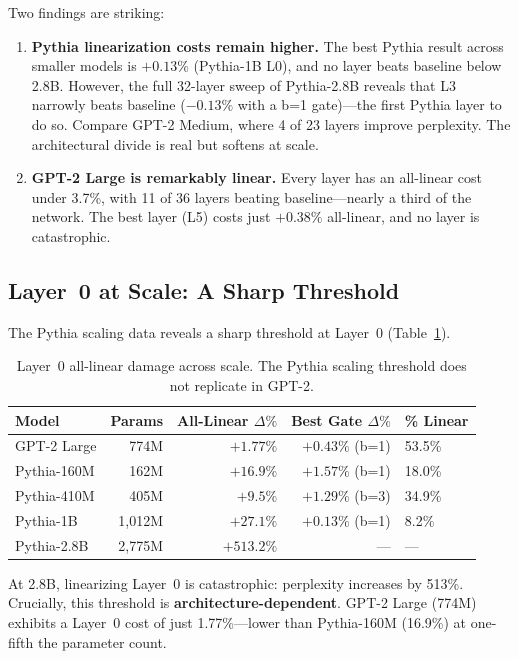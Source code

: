 \documentclass[11pt]{article}
\begin{document}
Two findings are striking:
\begin{enumerate}
    \item \textbf{Pythia linearization costs remain higher.} The best Pythia result across smaller models is $+0.13\%$ (Pythia-1B L0), and no layer beats baseline below 2.8B. However, the full 32-layer sweep of Pythia-2.8B reveals that L3 narrowly beats baseline ($-0.13\%$ with a b=1 gate)---the first Pythia layer to do so. Compare GPT-2 Medium, where 4 of 23 layers improve perplexity. The architectural divide is real but softens at scale.
    \item \textbf{GPT-2 Large is remarkably linear.} Every layer has an all-linear cost under 3.7\%, with 11 of 36 layers beating baseline---nearly a third of the network. The best layer (L5) costs just $+0.38\%$ all-linear, and no layer is catastrophic.
\end{enumerate}

\subsection{Layer~0 at Scale: A Sharp Threshold}

The Pythia scaling data reveals a sharp threshold at Layer~0 (Table~\ref{tab:layer0}).

\begin{table}[t]
\centering
\caption{Layer~0 all-linear damage across scale. The Pythia scaling threshold does not replicate in GPT-2.}
\label{tab:layer0}
\begin{tabular}{lrrrl}
\toprule
Model & Params & All-Linear $\Delta\%$ & Best Gate $\Delta\%$ & \% Linear \\
\midrule
GPT-2 Large & 774M & $+1.77\%$ & $+0.43\%$ (b=1) & 53.5\% \\
Pythia-160M & 162M & $+16.9\%$ & $+1.57\%$ (b=1) & 18.0\% \\
Pythia-410M & 405M & $+9.5\%$ & $+1.29\%$ (b=3) & 34.9\% \\
Pythia-1B & 1,012M & $+27.1\%$ & $+0.13\%$ (b=1) & 8.2\% \\
Pythia-2.8B & 2,775M & $+513.2\%$ & --- & --- \\
\bottomrule
\end{tabular}
\end{table}

At 2.8B, linearizing Layer~0 is catastrophic: perplexity increases by 513\%. Crucially, this threshold is \textbf{architecture-dependent}. GPT-2 Large (774M) exhibits a Layer~0 cost of just 1.77\%---lower than Pythia-160M (16.9\%) at one-fifth the parameter count.
\end{document}
